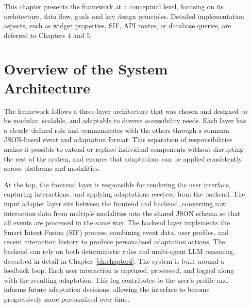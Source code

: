 \documentclass[openany]{book}
\begin{document}
This chapter presents the framework at a conceptual level, focusing on its architecture, data flow, goals and key design principles. Detailed implementation aspects, such as widget properties, SIF, API routes, or database queries, are deferred to Chapters 4 and 5.

\section{Overview of the System Architecture}
The framework follows a three-layer architecture that was chosen and designed to be modular, scalable, and adaptable to diverse accessibility needs. Each layer has a clearly defined role and communicates with the others through a common JSON-based event and adaptation format. This separation of responsibilities makes it possible to extend or replace individual components without disrupting the rest of the system, and ensures that adaptations can be applied consistently across platforms and modalities.

At the top, the frontend layer is responsible for rendering the user interface, capturing interactions, and applying adaptations received from the backend. The input adapter layer sits between the frontend and backend, converting raw interaction data from multiple modalities into the shared JSON schema so that all events are processed in the same way. The backend layer implements the Smart Intent Fusion (SIF) process, combining event data, user profiles, and recent interaction history to produce personalised adaptation actions. The backend can rely on both deterministic rules and multi-agent LLM reasoning, described in detail in Chapter~\ref{ch:chapter4}. 
The system is built around a feedback loop. Each user interaction is captured, processed, and logged along with the resulting adaptation. This log contributes to the user’s profile and informs future adaptation decisions, allowing the interface to become progressively more personalised over time.
\end{document}
